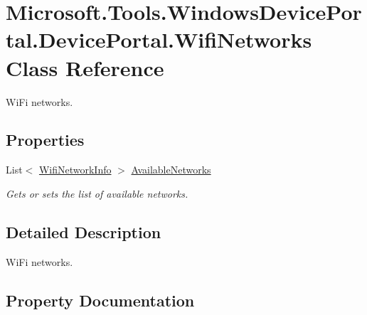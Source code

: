 \hypertarget{class_microsoft_1_1_tools_1_1_windows_device_portal_1_1_device_portal_1_1_wifi_networks}{}\section{Microsoft.\+Tools.\+Windows\+Device\+Portal.\+Device\+Portal.\+Wifi\+Networks Class Reference}
\label{class_microsoft_1_1_tools_1_1_windows_device_portal_1_1_device_portal_1_1_wifi_networks}


Wi\+Fi networks.  


\subsection*{Properties}
\begin{DoxyCompactItemize}
\item 
List$<$ \hyperlink{class_microsoft_1_1_tools_1_1_windows_device_portal_1_1_device_portal_1_1_wifi_network_info}{Wifi\+Network\+Info} $>$ \hyperlink{class_microsoft_1_1_tools_1_1_windows_device_portal_1_1_device_portal_1_1_wifi_networks_a30d6383d3ffd43b68fb8db308c1c8367}{Available\+Networks}
\begin{DoxyCompactList}\small\item\em Gets or sets the list of available networks. \end{DoxyCompactList}\end{DoxyCompactItemize}


\subsection{Detailed Description}
Wi\+Fi networks. 



\subsection{Property Documentation}
